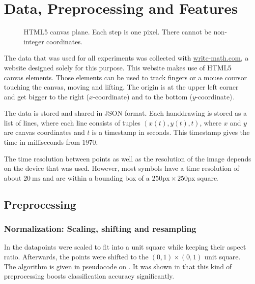 \chapter{Data, Preprocessing and Features}\label{ch:preprocessing}

\begin{wrapfigure}{r}{7cm}
  \vspace{-35pt}
  \begin{center}
    
  \end{center}
  \vspace{-20pt}
  \caption{HTML5 canvas plane. Each step is one pixel. There cannot be non-integer
           coordinates.}
  \label{fig:canvas-plane}
  \vspace{-10pt}
\end{wrapfigure}

The data that was used for all experiments was collected with
\href{http://write-math.com}{write-math.com}, a website designed solely for
this purpose. This website makes use of HTML5 canvas elements. Those elements
can be used to track fingers or a mouse coursor touching the canvas, moving
and lifting. The origin is at the upper left corner and get bigger to the right
($x$-coordinate) and to the bottom ($y$-coordinate).

The data is stored and shared in JSON format. Each handdrawing is stored as a
list of lines, where each line consists of tuples $(x(t), y(t), t)$, where $x$
and $y$ are canvas coordinates and $t$ is a timestamp in seconds. This timestamp
gives the time in milliseconds from 1970.

The time resolution between points as well as the resolution of the image
depends on the device that was used. However, most symbols have a time
resolution of about $\SI{20}{\milli\second}$ and are within a bounding box of a
$250 \text{px} \times 250 \text{px}$ square.

\section{Preprocessing}\label{sec:preprocessing}
\subsection{Normalization: Scaling, shifting and resampling}
In \cite{Kirsch} the datapoints were scaled to fit into a unit square while
keeping their aspect ratio. Afterwards, the points were shifted to
the $(0, 1) \times (0, 1)$ unit square. The algorithm is given in pseudocode on
. It was shown in \cite{Kirsch,Huang09} that
this kind of preprocessing boosts classification accuracy significantly.

